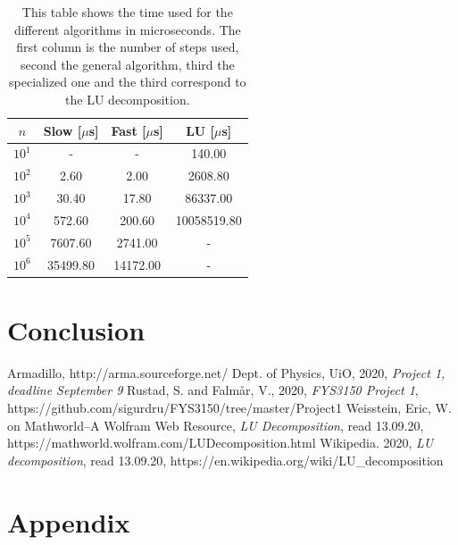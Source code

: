 \documentclass[reprint, english,notitlepage]{revtex4-1}  %
\begin{document}
\begin{table}  %
		\begin{tabular}{||c | c | c | c||}
			\hline
			$n$ & Slow [$\mu$s] & Fast [$\mu$s] & LU [$\mu$s]    \\ \hline
			$10^{1}$ & - & - & 140.00    \\ \hline
			$10^{2}$ & 2.60 & 2.00 & 2608.80    \\ \hline
			$10^{3}$ & 30.40 & 17.80 & 86337.00    \\ \hline
			$10^{4}$ & 572.60 & 200.60 & 10058519.80    \\ \hline
			$10^{5}$ & 7607.60 & 2741.00 & -    \\ \hline
			$10^{6}$ & 35499.80 & 14172.00 & -    \\ \hline
		\end{tabular}
	\caption{This table shows the time used for the different algorithms in microseconds. The first column is the number of steps used, second the general algorithm, third the specialized one and the third correspond to the LU decomposition.}
	\label{tab:time}
\end{table}

\begin{table}  %
\begin{adjustbox}{width=\linewidth}

\end{adjustbox}
\caption{}
\label{}
\end{table}

\section{Conclusion}

\onecolumngrid
\vspace{1cm} %
\newpage

\begin{thebibliography}{}
   Armadillo, http://arma.sourceforge.net/
   Dept. of Physics, UiO,  2020, \textit{Project 1, deadline September 9}
   Rustad, S. and Falmår, V.,  2020, \textit{FYS3150 Project 1}, https://github.com/sigurdru/FYS3150/tree/master/Project1
   Weisstein, Eric, W. on Mathworld--A Wolfram Web Resource, \textit{LU Decomposition}, read 13.09.20, https://mathworld.wolfram.com/LUDecomposition.html
   Wikipedia.  2020, \textit{LU decomposition}, read 13.09.20, https://en.wikipedia.org/wiki/LU\_decomposition
\end{thebibliography}



\section{Appendix}
\end{document}
